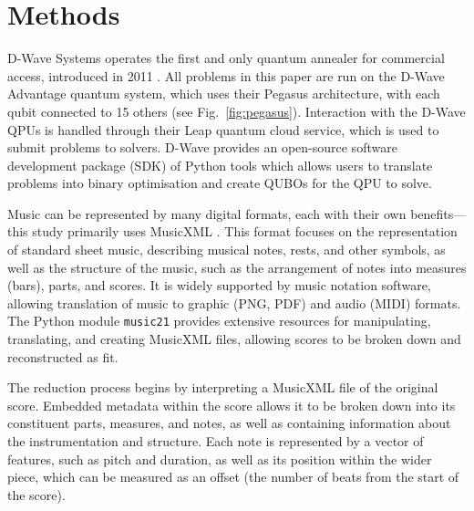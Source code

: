 \documentclass[aps,pra,12pt,onecolumn]{revtex4-2}
\begin{document}

\section{Methods}

D-Wave Systems operates the first and only quantum annealer for commercial access, introduced in 2011 \cite{dwave_manufactured_2011}. All problems in this paper are run on the D-Wave Advantage quantum system, which uses their Pegasus architecture, with each qubit connected to 15 others (see Fig.\ \ref{fig:pegasus}).
Interaction with the D-Wave QPUs is handled through their Leap quantum cloud service, which is used to submit problems to solvers. D-Wave provides an open-source software development package (SDK) of Python tools which allows users to translate problems into binary optimisation and create QUBOs for the QPU to solve.

Music can be represented by many digital formats, each with their own benefits—this study primarily uses MusicXML \cite{musicxml}. This format focuses on the representation of standard sheet music, describing musical notes, rests, and other symbols, as well as the structure of the music, such as the arrangement of notes into measures (bars), parts, and scores. It is widely supported by music notation software, allowing translation of music to graphic (PNG, PDF) and audio (MIDI) formats. The Python module \verb|music21| provides extensive resources for manipulating, translating, and creating MusicXML files, allowing scores to be broken down and reconstructed as fit.

The reduction process begins by interpreting a MusicXML file of the original score. Embedded metadata within the score allows it to be broken down into its constituent parts, measures, and notes, as well as containing information about the instrumentation and structure. Each note is represented by a vector of features, such as pitch and duration, as well as its position within the wider piece, which can be measured as an offset (the number of beats from the start of the score).
\end{document}
